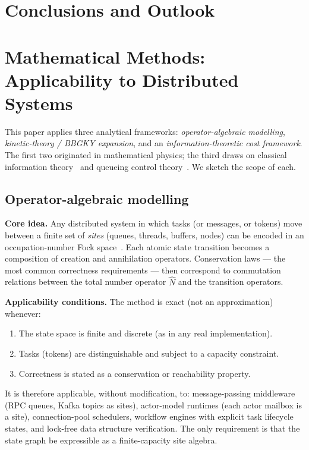 \documentclass[11pt,a4paper]{article}
\begin{document}
\section*{Conclusions and Outlook}
\label{chap:conclusions}
\setcounter{section}{0}

\section{Mathematical Methods: Applicability to Distributed Systems}
\label{sec:methods_scope}

This paper applies three analytical frameworks: \emph{operator-algebraic
modelling}, \emph{kinetic-theory / BBGKY expansion}, and an
\emph{information-theoretic cost framework}.  The first two originated in
mathematical physics; the third draws on classical information
theory~\cite{shannon1948,cover_thomas2006} and queueing control
theory~\cite{stidham1985,weber1990}.  We sketch the scope of each.

\subsection{Operator-algebraic modelling}

\medskip
\noindent\textbf{Core idea.}
Any distributed system in which tasks (or messages, or tokens) move
between a finite set of \emph{sites} (queues, threads, buffers, nodes)
can be encoded in an occupation-number Fock space~\cite{fock1932}.
Each atomic state transition becomes a composition of creation and
annihilation operators.  Conservation laws --- the most common
correctness requirements --- then correspond to commutation relations
between the total number operator $\hat{N}$ and the transition
operators.

\medskip
\noindent\textbf{Applicability conditions.}
The method is exact (not an approximation) whenever:
\begin{enumerate}
  \item The state space is finite and discrete (as in any real implementation).
  \item Tasks (tokens) are distinguishable and subject to a capacity constraint.
  \item Correctness is stated as a conservation or reachability property.
\end{enumerate}
It is therefore applicable, without modification, to: message-passing
middleware (RPC queues, Kafka topics as sites), actor-model runtimes
(each actor mailbox is a site), connection-pool schedulers, workflow
engines with explicit task lifecycle states, and lock-free data structure
verification.  The only requirement is that the state graph be expressible
as a finite-capacity site algebra.
\end{document}
